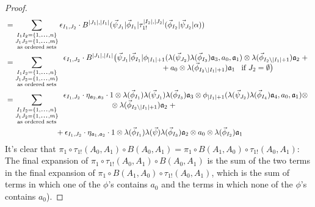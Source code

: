 \begin{proof}
\begin{align*}
&=
\sum \limits_{\substack{
  I_1I_2 = \{1,\smdots,n\}\\
  J_1J_2 = \{1,\smdots,m\}\\
  \textrm{as ordered sets}}}
\epsilon_{I_1,J_2} \cdot
B^{|J_1|, |I_1|} (\vec{\psi}_{J_1} | \vec{\phi}_{I_1} | 
  \tau_{1!}^{|I_2|, |J_2|} (\vec{\phi}_{I_2} | \vec{\psi}_{J_2} | \alpha)) \\
&= 
\sum \limits_{\substack{
  I_1I_2 = \{1,\smdots,n\}\\
  J_1J_2 = \{1,\smdots,m\}\\
  \textrm{as ordered sets}}}
\begin{array}{l}{}
\epsilon_{I_1,J_2} \cdot
B^{|J_1|, |I_1|} \big(\vec{\psi}_{J_1} | \vec{\phi}_{I_1} | \phi_{|I_1|+1} (
  \lambda(\vec{\psi}_{J_2}) \lambda(\vec{\phi}_{I_3}) 
  \mathfrak{a}_3, a_0, \mathfrak{a}_1) \otimes 
  \lambda(\vec{\phi}_{I_2 \backslash |I_1| + 1}) 
  \mathfrak{a}_2 \; + \\
\hphantom{{}moveovermoveovermoveover{}} 
  + a_0 \otimes \lambda(\vec{\phi}_{I_2 \backslash |I_1| + 1}) 
  \mathfrak{a}_1 \; \; \; 
  \text{if }J_2 = \emptyset \big)
\end{array} \\
&= 
\sum \limits_{\substack{
  I_1I_2 = \{1,\smdots,n\}\\
  J_1J_2 = \{1,\smdots,m\}\\
  \textrm{as ordered sets}}}
\begin{array}{l}  
\epsilon_{I_1,J_2} \cdot  
\eta_{\mathfrak{a}_2,\mathfrak{a}_3} \cdot  
1 \otimes \lambda(\vec{\phi}_{I_1}) \lambda(\vec{\psi}_{J_1}) 
  \lambda(\vec{\phi}_{I_3}) \mathfrak{a}_3 \otimes 
  \phi_{|I_1|+1} (\lambda(\vec{\psi}_{J_2}) \lambda(\vec{\phi}_{I_4}) 
  \mathfrak{a}_4, a_0, \mathfrak{a}_1) \otimes \\
  \phantom{{}moveovermov{}}\otimes 
  \lambda(\vec{\phi}_{I_2 \backslash |I_1| + 1}) 
  \mathfrak{a}_2 \; + 
\end{array}\\
&\hphantom{{}moveovermove{}} 
  +\epsilon_{I_1,J_2} \cdot  
  \eta_{\mathfrak{a}_1,\mathfrak{a}_2} \cdot  
  1 \otimes \lambda(\vec{\phi}_{I_1}) \lambda(\vec{\psi}) 
  \lambda(\vec{\phi}_{I_3}) \mathfrak{a}_2 \otimes 
  a_0 \otimes \lambda(\vec{\phi}_{I_2}) \mathfrak{a}_1
\end{align*}
%
It's clear that $\pi_1 \circ \tau_{1!}(A_0,A_1) 
\circ B(A_0,A_1) =  \pi_1 \circ B(A_1,A_0) 
\circ \tau_{1!}(A_0,A_1)$: The final expansion of 
$\pi_1 \circ \tau_{1!}(A_0,A_1) \circ B(A_0,A_1)$ 
is the sum of the two terms in the final expansion 
of $\pi_1 \circ B(A_1,A_0) \circ \tau_{1!}(A_0,A_1)$, 
which is the sum of terms in which one of 
the $\phi$'s contains $a_0$ and the terms in which 
none of the $\phi$'s contains $a_0$).
\end{proof}